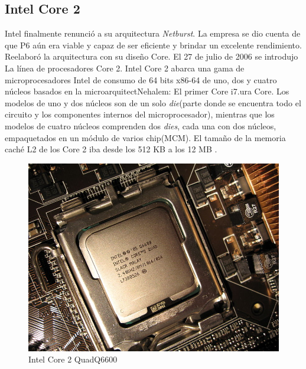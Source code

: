 \subsection{Intel Core 2}
Intel finalmente renunció a su arquitectura \emph{Netburst}. La empresa se dio cuenta de que P6 aún era viable y capaz de ser eficiente y brindar 
un excelente rendimiento. Reelaboró la arquitectura con su diseño Core. El 27 de julio de 2006 se introdujo La línea de procesadores Core 2.
Intel Core 2 abarca una gama de microprocesadores Intel de consumo de 64 bits x86-64 de uno, dos y cuatro 
núcleos basados en la microarquitectNehalem: El primer Core i7.ura Core. Los modelos de uno y dos núcleos son de un solo \emph{die}(parte donde se encuentra 
todo el circuito y los componentes internos del microprocesador), mientras que los modelos de cuatro núcleos comprenden dos \emph{dies}, cada una con dos núcleos, 
empaquetados en un módulo de varios chip(MCM). El tamaño de la memoria caché  L2 de los Core 2 iba desde los 512 KB a los 
12 MB .

\begin{figure}[htb]
	\centering
	\includegraphics[scale = 0.8]{Graphics/IntelCore_2_Q6600.jpeg}
	\caption{Intel Core 2 QuadQ6600}
	\label{fig:24}
\end{figure}

\newpage


